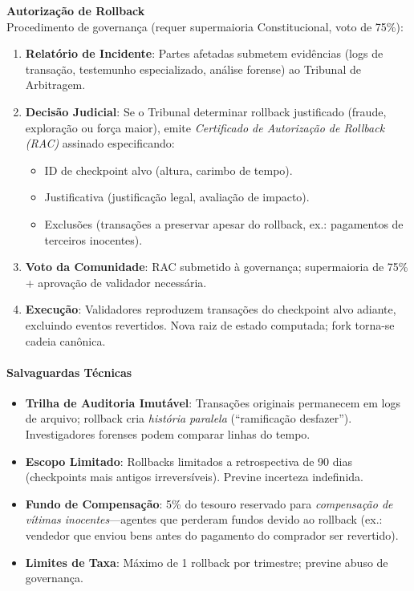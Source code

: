 \documentclass[11pt]{article}
\begin{document}
\textbf{Autorização de Rollback}\\
Procedimento de governança (requer supermaioria Constitucional, voto de 75\%):
\begin{enumerate}[noitemsep]
  \item \textbf{Relatório de Incidente}: Partes afetadas submetem evidências (logs de transação, testemunho especializado, análise forense) ao Tribunal de Arbitragem.
  \item \textbf{Decisão Judicial}: Se o Tribunal determinar rollback justificado (fraude, exploração ou força maior), emite \emph{Certificado de Autorização de Rollback (RAC)} assinado especificando:
    \begin{itemize}[noitemsep]
      \item ID de checkpoint alvo (altura, carimbo de tempo).
      \item Justificativa (justificação legal, avaliação de impacto).
      \item Exclusões (transações a preservar apesar do rollback, ex.: pagamentos de terceiros inocentes).
    \end{itemize}
  \item \textbf{Voto da Comunidade}: RAC submetido à governança; supermaioria de 75\% + aprovação de validador necessária.
  \item \textbf{Execução}: Validadores reproduzem transações do checkpoint alvo adiante, excluindo eventos revertidos. Nova raiz de estado computada; fork torna-se cadeia canônica.
\end{enumerate}

\paragraph{Salvaguardas Técnicas}
\begin{itemize}[noitemsep]
  \item \textbf{Trilha de Auditoria Imutável}: Transações originais permanecem em logs de arquivo; rollback cria \emph{história paralela} (``ramificação desfazer''). Investigadores forenses podem comparar linhas do tempo.
  \item \textbf{Escopo Limitado}: Rollbacks limitados a retrospectiva de 90 dias (checkpoints mais antigos irreversíveis). Previne incerteza indefinida.
  \item \textbf{Fundo de Compensação}: 5\% do tesouro reservado para \emph{compensação de vítimas inocentes}—agentes que perderam fundos devido ao rollback (ex.: vendedor que enviou bens antes do pagamento do comprador ser revertido).
  \item \textbf{Limites de Taxa}: Máximo de 1 rollback por trimestre; previne abuso de governança.
\end{itemize}
\end{document}
